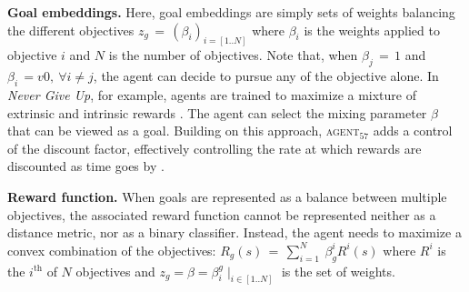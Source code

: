 \textbf{Goal embeddings.} Here, goal embeddings are simply sets of weights balancing the different objectives $z_g\,=\,(\beta_i)_{i=[1..N]}$ where $\beta_i$ is the weights applied to objective $i$ and $N$ is the number of objectives. Note that, when $\beta_j\,=\,1$ and $\beta_i\,=v0,~\forall i\neq j$, the agent can decide to pursue any of the objective alone. In \textit{Never Give Up}, for example, \rl agents are trained to maximize a mixture of extrinsic and intrinsic rewards \cite{badia2020never}. The agent can select the mixing parameter $\beta$ that can be viewed as a goal. Building on this approach, \textsc{agent$_{57}$} adds a control of the discount factor, effectively controlling the rate at which rewards are discounted as time goes by \cite{badia2020agent57}.

\textbf{Reward function.} When goals are represented as a balance between multiple objectives, the associated reward function cannot be represented neither as a distance metric, nor as a binary classifier. Instead, the agent needs to maximize a convex combination of the objectives: $R_g(s)\,=\,\sum_{i=1}^N~\beta_g^i R^i(s)$ where $R^i$ is the $i^\text{th}$ of $N$ objectives and $z_g=\beta=\beta_i^g\mid_{i\in[1..N]}$ is the set of weights.


